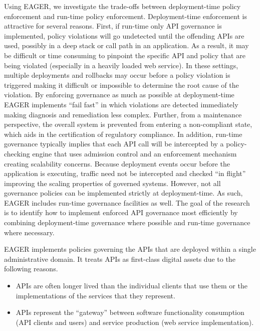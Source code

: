 Using EAGER, we investigate the trade-offs between deployment-time policy
enforcement and run-time policy enforcement.
Deployment-time enforcement is attractive for several
reasons.  First, if run-time only API governance is implemented, 
policy violations will go undetected until the offending APIs are used,
possibly in a deep stack or call path in an application.  
As a result, it may be difficult or time consuming to pinpoint the specific
API and policy that are being violated (especially in a heavily loaded web service).
In these settings, multiple deployments and rollbacks may occur before a policy
violation is triggered making it difficult or impossible to determine the root
cause of the violation.  By enforcing governance as much as possible
at deployment-time
EAGER implements ``fail fast'' in which violations are detected
immediately making diagnosis and remediation less complex.  
Further, from a maintenance perspective,  the overall
system is prevented from entering a non-compliant state, which aids in the
certification of regulatory compliance.  In addition, run-time governance
typically implies that each API call will be intercepted by a policy-checking engine
that uses admission control and an enforcement mechanism creating scalability
concerns.  Because deployment
events occur before the application is executing,
traffic need not be intercepted and checked ``in flight''
improving the
scaling properties of governed systems.  However, not all governance policies can be
implemented strictly at deployment-time.  As such, EAGER includes run-time
governance facilities as well.  The goal of the research is to identify how to
implement enforced API governance most efficiently by combining deployment-time  
governance where possible and run-time governance where necessary.


EAGER implements policies governing the APIs that are 
deployed within a single administrative domain. It treats APIs as
first-class digital assets due to the following reasons.
\begin{itemize}
\item APIs are often
longer lived than the individual clients that use them or the implementations
of the services that they represent.
\item APIs represent the
``gateway'' between software functionality consumption 
(API clients and users) and service
production (web service implementation).
\end{itemize}

